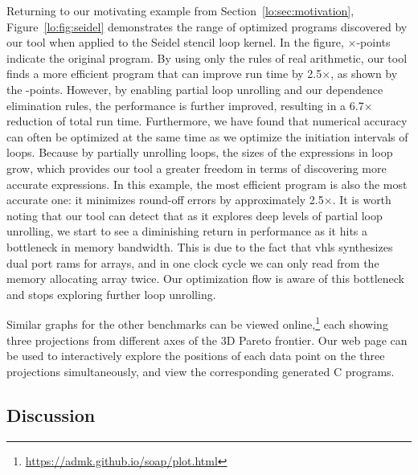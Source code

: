 Returning to our motivating example from Section~\ref{lo:sec:motivation},
Figure~\ref{lo:fig:seidel} demonstrates the range of optimized programs
discovered by our tool when applied to the Seidel stencil loop kernel. In
the figure, $\times$-points indicate the original program. By using only the
rules of real arithmetic, our tool finds a more efficient program that can
improve run time by 2.5$\times$, as shown by the \redcircle-points. However,
by enabling partial loop unrolling and our dependence elimination rules, the
performance is further improved, resulting in a 6.7$\times$ reduction of
total run time.  Furthermore, we have found that numerical accuracy can often
be optimized at the same time as we optimize the initiation intervals of
loops. Because by partially unrolling loops, the sizes of the expressions in
loop grow, which provides our tool a greater freedom in terms of discovering
more accurate expressions. In this example, the most efficient program is
also the most accurate one: it minimizes round-off errors by approximately
2.5$\times$. It is worth noting that our tool can detect that as it explores
deep levels of partial loop unrolling, we start to see a diminishing return
in performance as it hits a bottleneck in memory bandwidth.  This is due to
the fact that \gls{vhls} synthesizes dual port \glspl{ram} for arrays, and in
one clock cycle we can only read from the memory allocating array twice.  Our
optimization flow is aware of this bottleneck and stops exploring further loop
unrolling.

Similar graphs for the other benchmarks can be viewed
online,\footnote{\url{https://admk.github.io/soap/plot.html}} each showing
three projections from different axes of the 3D Pareto frontier. Our web page
can be used to interactively explore the positions of each data point on the
three projections simultaneously, and view the corresponding generated C
programs.

\subsection{Discussion}
\label{lo:sec:results_discussion}

